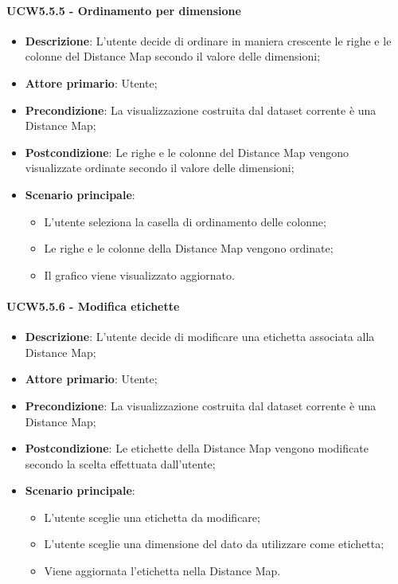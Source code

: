 \paragraph{UCW5.5.5 - Ordinamento per dimensione}
\label{par:ucw5.5.5}
\begin{itemize}
    \item \textbf{Descrizione}: L'utente decide di ordinare in maniera crescente le righe e le colonne del Distance Map secondo il valore delle dimensioni;
    \item \textbf{Attore primario}: Utente;
    \item \textbf{Precondizione}: La visualizzazione costruita dal dataset corrente è una Distance Map;
    \item \textbf{Postcondizione}: Le righe e le colonne del Distance Map vengono visualizzate ordinate secondo il valore delle dimensioni;
    \item \textbf{Scenario principale}:
          \begin{itemize}
              \item L'utente seleziona la casella di ordinamento delle colonne;
              \item Le righe e le colonne della Distance Map vengono ordinate;
              \item Il grafico viene visualizzato aggiornato.
          \end{itemize}
\end{itemize}


\paragraph{UCW5.5.6 - Modifica etichette}
\label{par:ucw5.5.6}
\begin{itemize}
    \item \textbf{Descrizione}: L'utente decide di modificare una etichetta associata alla Distance Map;
    \item \textbf{Attore primario}: Utente;
    \item \textbf{Precondizione}: La visualizzazione costruita dal dataset corrente è una Distance Map;
    \item \textbf{Postcondizione}: Le etichette della Distance Map vengono modificate secondo la scelta effettuata dall'utente;
    \item \textbf{Scenario principale}:
          \begin{itemize}
              \item L'utente sceglie una etichetta da modificare;
              \item L'utente sceglie una dimensione del dato da utilizzare come etichetta;
              \item Viene aggiornata l'etichetta nella Distance Map.
          \end{itemize}
\end{itemize}


